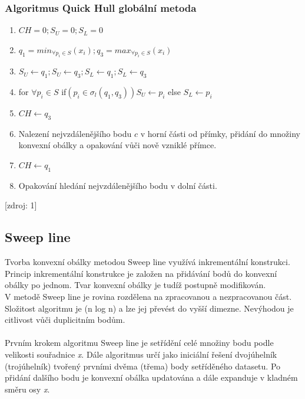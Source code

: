 \documentclass[a4paper, 12pt]{article}
\begin{document}
\newpage
\subsubsection{Algoritmus Quick Hull globální metoda}
\begin{enumerate}
\item $CH = 0; S_U = 0; S_L = 0 $ 
\item $ q_1 =  min_{\forall p_i \in S}(x_i); q_3 =  max_{\forall p_i \in S}(x_i) $ 
\item $S_U \leftarrow q_1; S_U \leftarrow q_3; S_L \leftarrow q_1; S_L \leftarrow q_3 $
\item for $\forall p_i \in S  $
\subitem  if$ (p_i \in \sigma_l(q_1, q_3)) S_U \leftarrow p_i  $
\subitem else $ S_L \leftarrow p_i  $
\item $CH \leftarrow q_3$
\item Nalezení nejvzdálenějšího bodu $c$ v horní části od přímky, přidání do množiny konvexní obálky a opakování vůči nově vzniklé přímce.
\item $CH \leftarrow q_1$
\item Opakování hledání nejvzdálenějšího bodu v dolní části.
\end{enumerate}
[zdroj: 1]
\newpage
\subsection{Sweep line}
Tvorba konvexní obálky metodou Sweep line využívá inkrementální konstrukci.\\ Princip inkrementální konstrukce je založen na přidávání bodů do konvexní obálky po jednom. Tvar konvexní obálky je tudíž postupně modifikován.\\
V metodě Sweep line je rovina rozdělena na zpracovanou a nezpracovanou část. Složitost algoritmu je (n log n) a lze jej převést do vyšší dimezne. Nevýhodou je citlivost vůči duplicitním bodům.\\
\\
Prvním krokem algoritmu Sweep line je setřídění celé množiny bodu podle velikosti souřadnice \textit{x}. Dále algoritmus určí jako iniciální řešení dvojúhelník (trojúhelník) tvořený prvními dvěma (třema) body setříděného datasetu. Po přidání dalšího bodu je konvexní obálka updatována a dále expanduje v kladném směru osy \textit{x}. 
\end{document}
